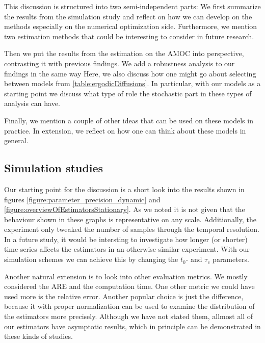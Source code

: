 This discussion is structured into two semi-independent parts: We first summarize the results from the simulation study and reflect on how we can develop on the methods especially on the numerical optimization side. Furthermore, we mention two estimation methods that could be interesting to consider in future research.

Then we put the results from the estimation on the AMOC into perspective, contrasting it with previous findings. We add a robustness analysis to our findings in the same way  Here, we also discuss how one might go about selecting between models from \ref{table:ergodicDiffusions}. In particular, with our models as a starting point we discuss what type of role the stochastic part in these types of analysis can have. 

Finally, we mention a couple of other ideas that can be used on these models in practice. In extension, we reflect on how one can think about these models in general.
\subsection{Simulation studies}
Our starting point for the discussion is a short look into the results shown in figures \ref{figure:parameter_precision_dynamic} and \ref{figure:overviewOfEstimatorsStationary}. As we noted it is not given that the behaviour shown in these graphs is representative on any scale. Additionally, the experiment only tweaked the number of samples through the temporal resolution. In a future study, it would be intersting to investigate how longer (or shorter) time series affects the estimators in an otherwise similar experiment. With our simulation schemes we can achieve this by changing the $t_0$- and $\tau_c$ parameters.

Another natural extension is to look into other evaluation metrics. We mostly considered the ARE and the computation time. One other metric we could have used more is the relative error. Another popular choice is just the difference, because it with proper normalization can be used to examine the distribution of the estimators more precisely. Although we have not stated them, allmost all of our estimators have asymptotic results, which in principle can be demonstrated in these kinds of studies.

